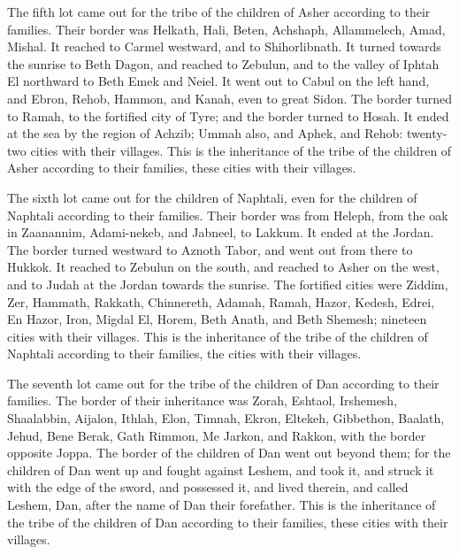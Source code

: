  The fifth lot came out for the tribe of the children of
Asher according to their families.  Their border was
Helkath, Hali, Beten, Achshaph,  Allammelech, Amad, Mishal.
It reached to Carmel westward, and to Shihorlibnath.  It
turned towards the sunrise to Beth Dagon, and reached to Zebulun, and to
the valley of Iphtah El northward to Beth Emek and Neiel. It went out to
Cabul on the left hand,  and Ebron, Rehob, Hammon, and
Kanah, even to great Sidon.  The border turned to Ramah, to
the fortified city of Tyre; and the border turned to Hosah. It ended at
the sea by the region of Achzib;  Ummah also, and Aphek,
and Rehob: twenty-two cities with their villages.  This is
the inheritance of the tribe of the children of Asher according to their
families, these cities with their villages.

 The sixth lot came out for the children of Naphtali, even
for the children of Naphtali according to their families. 
Their border was from Heleph, from the oak in Zaanannim, Adami-nekeb,
and Jabneel, to Lakkum. It ended at the Jordan.  The border
turned westward to Aznoth Tabor, and went out from there to Hukkok. It
reached to Zebulun on the south, and reached to Asher on the west, and
to Judah at the Jordan towards the sunrise.  The fortified
cities were Ziddim, Zer, Hammath, Rakkath, Chinnereth, 
Adamah, Ramah, Hazor,  Kedesh, Edrei, En Hazor,
 Iron, Migdal El, Horem, Beth Anath, and Beth Shemesh;
nineteen cities with their villages.  This is the
inheritance of the tribe of the children of Naphtali according to their
families, the cities with their villages.

 The seventh lot came out for the tribe of the children of
Dan according to their families.  The border of their
inheritance was Zorah, Eshtaol, Irshemesh,  Shaalabbin,
Aijalon, Ithlah,  Elon, Timnah, Ekron, 
Eltekeh, Gibbethon, Baalath,  Jehud, Bene Berak, Gath
Rimmon,  Me Jarkon, and Rakkon, with the border opposite
Joppa.  The border of the children of Dan went out beyond
them; for the children of Dan went up and fought against Leshem, and
took it, and struck it with the edge of the sword, and possessed it, and
lived therein, and called Leshem, Dan, after the name of Dan their
forefather.  This is the inheritance of the tribe of the
children of Dan according to their families, these cities with their
villages.

